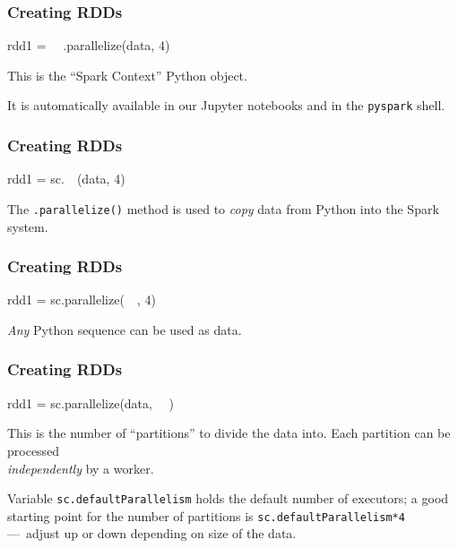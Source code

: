 \documentclass[english,serif,mathserif]{beamer}
\begin{document}
\begin{frame}[fragile]
  \frametitle{Creating RDDs}
  \begin{center}
    \begin{python}
      rdd1 = ~~.parallelize(data, 4)
    \end{python}

      \+
      This is the ``Spark Context'' Python object.

      \+ It is automatically available in our Jupyter notebooks and in
      the \texttt{pyspark} shell.
    \end{center}
\end{frame}


\begin{frame}[fragile]
  \frametitle{Creating RDDs}
  \begin{center}
    \begin{python}
      rdd1 = sc.~~(data, 4)
    \end{python}

    \+ The \texttt{.parallelize()} method is used to \emph{copy} data
    from Python into the Spark system.
  \end{center}
\end{frame}


\begin{frame}[fragile]
  \frametitle{Creating RDDs}
  \begin{center}
    \begin{python}
      rdd1 = sc.parallelize(~~, 4)
    \end{python}

      \+
      \emph{Any} Python sequence can be used as data.
    \end{center}
\end{frame}


\begin{frame}[fragile]
  \frametitle{Creating RDDs}
  \begin{center}
    \begin{python}
      rdd1 = sc.parallelize(data, ~~)
    \end{python}

    \+ This is the number of ``partitions'' to divide the data into.
    Each partition can be processed \\ \emph{independently} by a worker.

    \+ Variable \texttt{sc.defaultParallelism} holds the default
    number of executors; a good starting point for the number of
    partitions is \texttt{sc.defaultParallelism*4}
    ---~adjust up or down depending on size of the data.
    \end{center}
\end{frame}
\end{document}
